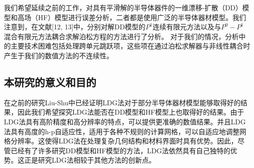 我们希望延续之前的工作\cite{liu2004local,liu2007locala}，对具有平滑解的半导体器件的一维漂移-扩散（DD）模型和高场（HF）模型进行误差分析，二者都是使用广泛的半导体器材模型。我们注意到，在文献[12, 13]中，分别对解DD模型的$P^1$连续有限元方法以及与$P^0-P^1$混合有限元方法耦合求解泊松方程的方法进行了分析。
对于我们的情况，分析中的主要技术困难包括处理跨单元跳跃项，这些项在通过泊松求解器与非线性耦合时产生于我们的数值方法的不连续性。
\subsection{本研究的意义和目的}
在之前的研究Liu-Shu中已经证明LDG法对于部分半导体器材模型能够取得好的结果，因此我们希望探究LDG法能否在DD模型和HF模型上也取得好的结果。由于LDG法具有高阶精度和高分辨率的特点，可以提供更准确的数值结果。并且LDG法具有高度的h-p自适应性，适用于各种不规则的计算网格，可以自适应地调整网格分辨率。这使得LDG法在处理复杂几何结构和材料界面时具有优势。因此，尽管已经有了许多研究DD模型和HF模型的方法，LDG法依然具有自己独特的优势。这正是研究LDG法相较于其他方法的创新点。